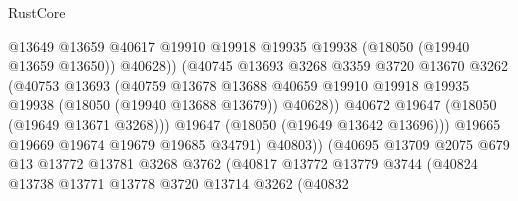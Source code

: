 \begin{lexlean}{RustCore}
\begin{coremodule}
                                      @13649
                                      @13659
                                      @40617
                                      @19910
                                      @19918
                                      @19935
                                      @19938
                                      (@18050 (@19940 @13659 @13650))
                                      @40628))
                                  (@40745
                                    @13693
                                    @3268
                                    @3359
                                    @3720
                                    @13670
                                    @3262
                                    (@40753
                                      @13693
                                      (@40759
                                        @13678
                                        @13688
                                        @40659
                                        @19910
                                        @19918
                                        @19935
                                        @19938
                                        (@18050 (@19940 @13688 @13679))
                                        @40628))
                                    @40672
                                    @19647
                                    (@18050 (@19649 @13671 @3268)))
                                  @19647
                                  (@18050 (@19649 @13642 @13696)))
                                @19665
                                @19669
                                @19674
                                @19679
                                @19685
                                @34791)
                              @40803))
                          (@40695
                            @13709
                            @2075
                            @679
                            @13
                            @13772
                            @13781
                            @3268
                            @3762
                            (@40817
                              @13772
                              @13779
                              @3744
                              (@40824
                                @13738
                                @13771
                                @13778
                                @3720
                                @13714
                                @3262
                                (@40832

\end{coremodule}
\end{lexlean}
